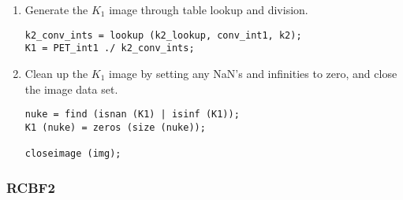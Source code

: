 \begin{enumerate}
\item Generate the $K_1$ image through table lookup and division.
\begin{verbatim}
k2_conv_ints = lookup (k2_lookup, conv_int1, k2);
K1 = PET_int1 ./ k2_conv_ints;
\end{verbatim}

\item Clean up the $K_1$ image by setting any NaN's and infinities to
zero, and close the image data set.
\begin{verbatim}
nuke = find (isnan (K1) | isinf (K1));
K1 (nuke) = zeros (size (nuke));

closeimage (img);
\end{verbatim}
\end{enumerate}


\subsubsection{RCBF2}

